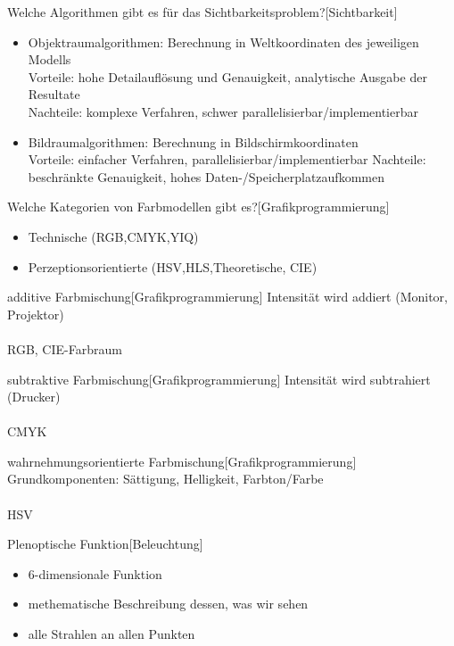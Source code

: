 \documentclass[a7paper,print]{kartei}
\begin{document}
\begin{karte}[CGIS]{Welche Algorithmen gibt es für das Sichtbarkeitsproblem?}[Sichtbarkeit]
\begin{itemize}
\item Objektraumalgorithmen: Berechnung in Weltkoordinaten des jeweiligen Modells\\
	 Vorteile: hohe Detailauflösung und Genauigkeit, analytische Ausgabe der Resultate\\
	 Nachteile: komplexe Verfahren, schwer parallelisierbar/implementierbar
\item Bildraumalgorithmen: Berechnung in Bildschirmkoordinaten\\
	 Vorteile: einfacher Verfahren, parallelisierbar/implementierbar
	Nachteile: beschränkte Genauigkeit, hohes Daten-/Speicherplatzaufkommen
\end{itemize}
\end{karte}

\begin{karte}[CGIS]{Welche Kategorien von Farbmodellen gibt es?}[Grafikprogrammierung]
\begin{itemize}
\item Technische (RGB,CMYK,YIQ)
\item Perzeptionsorientierte (HSV,HLS,Theoretische, CIE)
\end{itemize}
\end{karte}

\begin{karte}[CGIS]{additive Farbmischung}[Grafikprogrammierung]
Intensität wird addiert (Monitor, Projektor)\\
\ \\ RGB, CIE-Farbraum
\end{karte}

\begin{karte}[CGIS]{subtraktive Farbmischung}[Grafikprogrammierung]
Intensität wird subtrahiert (Drucker)\\
\ \\ CMYK
\end{karte}

\begin{karte}[CGIS]{wahrnehmungsorientierte Farbmischung}[Grafikprogrammierung]
Grundkomponenten: Sättigung, Helligkeit, Farbton/Farbe\\
\ \\ HSV
\end{karte}

\begin{karte}[CGIS]{Plenoptische Funktion}[Beleuchtung]
\begin{itemize}
\item 6-dimensionale Funktion
\item methematische Beschreibung dessen, was wir sehen
\item alle Strahlen an allen Punkten
\end{itemize}
\end{karte}
\end{document}
